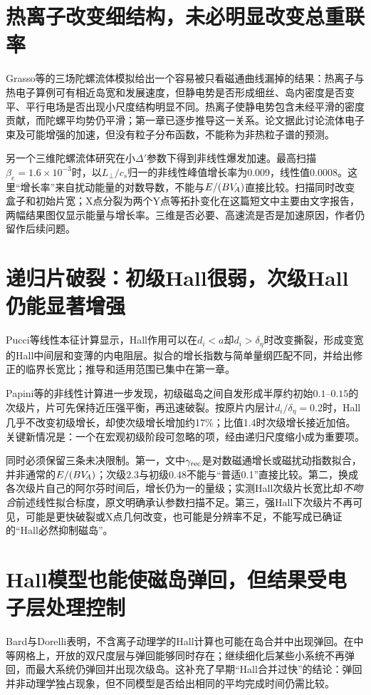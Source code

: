 \section{热离子改变细结构，未必明显改变总重联率}
Grasso等的三场陀螺流体模拟给出一个容易被只看磁通曲线漏掉的结果：热离子与热电子算例可有相近岛宽和发展速度，但静电势是否形成细丝、岛内密度是否变平、平行电场是否出现小尺度结构明显不同。热离子使静电势包含未经平滑的密度贡献，而陀螺平均势仍平滑；第一章已逐步推导这一关系。论文据此讨论流体电子束及可能增强的加速，但没有粒子分布函数，不能称为非热粒子谱的预测。\citep{E469}

另一个三维陀螺流体研究在小$\Delta'$参数下得到非线性爆发加速。最高扫描$\beta_e=1.6\times10^{-3}$时，以$L_\perp/c_s$归一的非线性峰值增长率为0.009，线性值0.0008。这里“增长率”来自扰动能量的对数导数，不能与$E/(BV_{\!A})$直接比较。扫描同时改变盒子和初始片宽；X点分裂为两个Y点等拓扑变化在这篇短文中主要由文字报告，两幅结果图仅显示能量与增长率。三维是否必要、高速流是否是加速原因，作者仍留作后续问题。\citep{L184}

\section{递归片破裂：初级Hall很弱，次级Hall仍能显著增强}
Pucci等线性本征计算显示，Hall作用可以在$d_i<a$却$d_i>\delta_\eta$时改变撕裂，形成变宽的Hall中间层和变薄的内电阻层。拟合的增长指数与简单量纲匹配不同，并给出修正的临界长宽比；推导和适用范围已集中在第一章。\citep{L236}

Papini等的非线性计算进一步发现，初级磁岛之间自发形成半厚约初始$0.1$--$0.15$的次级片，片可先保持近压强平衡，再迅速破裂。按原片内层计$d_i/\delta_\eta=0.2$时，Hall几乎不改变初级增长，却使次级增长增加约17\%；比值1.4时次级增长接近加倍。关键新情况是：一个在宏观初级阶段可忽略的项，经由递归尺度缩小成为重要项。\citep{L262}

同时必须保留三条未决限制。第一，文中$\gamma_{\rm rec}$是对数磁通增长或磁扰动指数拟合，并非通常的$E/(BV_{\!A})$；次级$2.3$与初级$0.48$不能与“普适0.1”直接比较。第二，换成各次级片自己的阿尔芬时间后，增长仍为一的量级；实测Hall次级片长宽比却\emph{不吻合}前述线性拟合标度，原文明确承认参数扫描不足。第三，强Hall下次级片不再可见，可能是更快破裂或X点几何改变，也可能是分辨率不足，不能写成已确证的“Hall必然抑制磁岛”。

\section{Hall模型也能使磁岛弹回，但结果受电子层处理控制}
Bard与Dorelli表明，不含离子动理学的Hall计算也可能在岛合并中出现弹回。在中等网格上，开放的双尺度层与弹回能够同时存在；继续细化后某些小系统不再弹回，而最大系统仍弹回并出现次级岛。这补充了早期“Hall合并过快”的结论：弹回并非动理学独占现象，但不同模型是否给出相同的平均完成时间仍需比较。\citep{L251,Ng2015,Ng2017}

